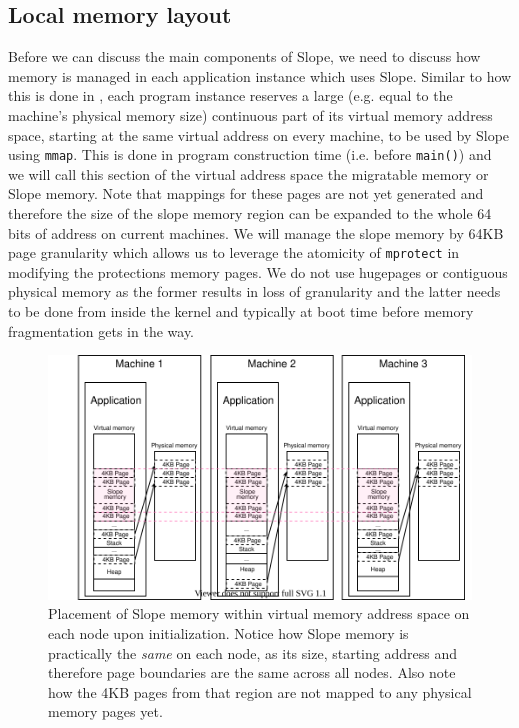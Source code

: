\subsection{Local memory layout}
Before we can discuss the main components of Slope, we need to discuss how
memory is managed in each application instance which uses Slope. Similar to
how this is done in \cite{memon2018ramp}, each program instance reserves a
large  (e.g. equal to the machine's physical memory size) continuous part
of its virtual memory address space, starting at the same virtual address
on every machine, to be used by Slope using \texttt{mmap}.
This is done in program construction
time (i.e. before \texttt{main()}) and we will call this section of the virtual
address space the migratable memory or Slope memory. Note that mappings for
these pages are not yet generated and therefore the size of the slope memory
region can be expanded to the whole 64 bits of address on current machines.
We will manage the slope memory by 64KB page granularity which allows us to
leverage
the atomicity of \texttt{mprotect} in modifying the protections memory pages.
We do not use hugepages or contiguous physical memory as the former results in
loss of granularity and the latter needs to be done from inside the kernel and
typically at boot time before memory fragmentation gets in the way.

\begin{figure}
\centering
{}
\includegraphics[width=1\textwidth]{local-memory-management-phys-log.drawio}
\caption{
    Placement of Slope memory within virtual memory address space on each node
    upon initialization.
    Notice how Slope memory is practically the \emph{same} on each node, as
    its size, starting address and therefore page boundaries are the same
    across all nodes. Also note how
    the 4KB pages from that region are not mapped to any physical memory pages
    yet.
}
\label{fig:localmemorymanagementphyslog}
\end{figure}

